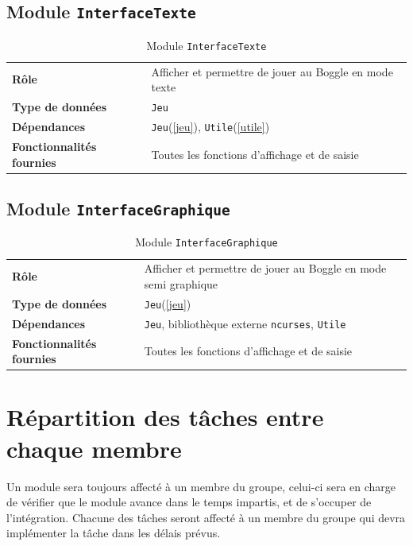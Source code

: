\documentclass[12pt,a4paper,openany]{article}
\begin{document}
		\subsection{Module \texttt{InterfaceTexte}}
		\begin{table}[H]
			\centering
		\begin{tabular}{p{5cm} p{12cm}}
			\textbf{Rôle} & Afficher et permettre de jouer au Boggle en mode texte\\ 
			\textbf{Type de données} & \texttt{Jeu}\\ 
			\textbf{Dépendances} & \texttt{Jeu}(\ref{jeu}), \texttt{Utile}(\ref{utile})\\ 
			\textbf{Fonctionnalités fournies} & Toutes les fonctions d'affichage et de saisie
		\end{tabular}
		\caption{Module \texttt{InterfaceTexte}}
	\end{table}
		\subsection{Module \texttt{InterfaceGraphique}}
		\begin{table}[H]
			\centering
		\begin{tabular}{p{5cm} p{12cm}}
			\textbf{Rôle} & Afficher et permettre de jouer au Boggle en mode semi graphique\\ 
			\textbf{Type de données} & \texttt{Jeu}(\ref{jeu})\\ 
			\textbf{Dépendances} & \texttt{Jeu}, bibliothèque externe \texttt{ncurses}, \texttt{Utile}\\ 
			\textbf{Fonctionnalités fournies} & Toutes les fonctions d'affichage et de saisie
		\end{tabular}
		\caption{Module \texttt{InterfaceGraphique}}
	\end{table}
	\section{Répartition des tâches entre chaque membre}
	Un module sera toujours affecté à un membre du groupe, celui-ci sera en charge de vérifier que le module avance dans le temps impartis, et de s'occuper de
	l'intégration. Chacune des tâches seront affecté à un membre du groupe qui devra implémenter la tâche dans les délais prévus.
\end{document}
